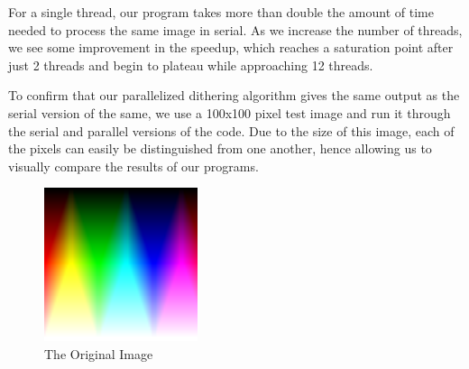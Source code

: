 \documentclass{article}
\begin{document}
\noindent For a single thread, our program takes more than double the amount of time needed to process the same image in serial. As we increase the number of threads, we see some improvement in the speedup, which reaches a saturation point after just 2 threads and begin to plateau while approaching 12 threads.

\medskip
\noindent To confirm that our parallelized dithering algorithm gives the same output as the serial version of the same, we use a 100x100 pixel test image and run it through the serial and parallel versions of the code. Due to the size of this image, each of the pixels can easily be distinguished from one another, hence allowing us to visually compare the results of our programs.

\begin{figure}[h]
    \centering
    \includegraphics[width=0.40\textwidth]{images/RGB_color_gradient_100x100.png}
    \caption{The Original Image}
    \label{fig:confirmation_image}
\end{figure}
\end{document}
